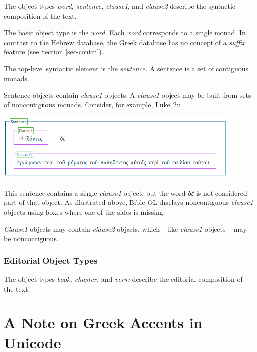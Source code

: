\documentclass[11pt,oneside,a4paper]{memoir}
\newcommand*{\bibleref}[3]{#1~#2\thinspace:\thinspace#3}
\begin{document}
The object types \emph{word, sentence, clause1,} and \emph{clause2} describe the syntactic
composition of the text.

The basic object type is the \emph{word.} Each \emph{word} corresponds to a single
monad. In contrast to the Hebrew database, the Greek database has no concept of a
\emph{suffix} feature (see Section \ref{sec-contin}).

The top-level syntactic element is the \emph{sentence.} A sentence is a set of
contiguous monads.

Sentence objects contain \emph{clause1} objects. A \emph{clause1} object may be built from sets of
noncontiguous monads. Consider, for example, \bibleref{Luke}{2}{17}:

\begin{center}
  \includegraphics[width=0.9\textwidth]{luke2_17.png}
\end{center}

This sentence contains a single \emph{clause1} object, but the word \emph{δὲ} is not considered part
of that object. As illustrated above, Bible OL displays noncontiguous \emph{clause1} objects using
boxes where one of the sides is missing.

\emph{Clause1} objects may contain \emph{clause2} objects, which -- like
\emph{clause1} objects -- may be noncontiguous.

\subsubsection{Editorial Object Types}

The object types \emph{book, chapter,} and \emph{verse} describe the editorial composition of the
text.

\section{A Note on Greek Accents in Unicode}
\end{document}
